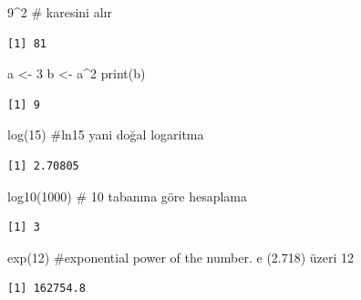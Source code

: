 \documentclass[
  letterpaper,
  DIV=11,
  numbers=noendperiod]{scrreprt}
\newenvironment{Shaded}{\begin{snugshade}}{\end{snugshade}}
\newcommand{\CommentTok}[1]{\textcolor[rgb]{0.37,0.37,0.37}{#1}}
\newcommand{\DecValTok}[1]{\textcolor[rgb]{0.68,0.00,0.00}{#1}}
\newcommand{\FunctionTok}[1]{\textcolor[rgb]{0.28,0.35,0.67}{#1}}
\newcommand{\NormalTok}[1]{\textcolor[rgb]{0.00,0.23,0.31}{#1}}
\newcommand{\OtherTok}[1]{\textcolor[rgb]{0.00,0.23,0.31}{#1}}
\newcommand{\SpecialCharTok}[1]{\textcolor[rgb]{0.37,0.37,0.37}{#1}}
\begin{document}
\begin{Shaded}
\begin{Highlighting}[]
\DecValTok{9}\SpecialCharTok{\^{}}\DecValTok{2} \CommentTok{\# karesini alır }
\end{Highlighting}
\end{Shaded}

\begin{verbatim}
[1] 81
\end{verbatim}

\begin{Shaded}
\begin{Highlighting}[]
\NormalTok{a }\OtherTok{\textless{}{-}}  \DecValTok{3} 
\NormalTok{b }\OtherTok{\textless{}{-}}\NormalTok{  a}\SpecialCharTok{\^{}}\DecValTok{2} 
\FunctionTok{print}\NormalTok{(b) }
\end{Highlighting}
\end{Shaded}

\begin{verbatim}
[1] 9
\end{verbatim}

\begin{Shaded}
\begin{Highlighting}[]
\FunctionTok{log}\NormalTok{(}\DecValTok{15}\NormalTok{) }\CommentTok{\#ln15 yani doğal logaritma }
\end{Highlighting}
\end{Shaded}

\begin{verbatim}
[1] 2.70805
\end{verbatim}

\begin{Shaded}
\begin{Highlighting}[]
\FunctionTok{log10}\NormalTok{(}\DecValTok{1000}\NormalTok{) }\CommentTok{\# 10 tabanına göre hesaplama }
\end{Highlighting}
\end{Shaded}

\begin{verbatim}
[1] 3
\end{verbatim}

\begin{Shaded}
\begin{Highlighting}[]
\FunctionTok{exp}\NormalTok{(}\DecValTok{12}\NormalTok{) }\CommentTok{\#exponential power of the number. e (2.718) üzeri 12 }
\end{Highlighting}
\end{Shaded}

\begin{verbatim}
[1] 162754.8
\end{verbatim}
\end{document}
